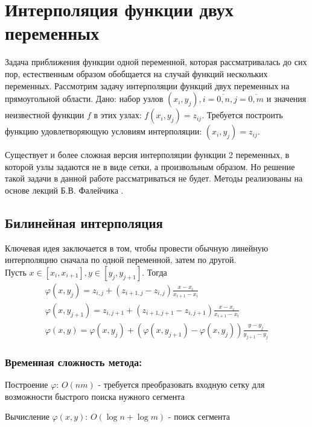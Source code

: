\section{Интерполяция функции двух переменных}

Задача приближения функции одной переменной, которая рассматривалась до сих пор, естественным образом обобщается на случай функций нескольких переменных. Рассмотрим задачу интерполяции функций двух переменных на прямоугольной области. Дано: набор узлов $(x_i,y_j), i=\overline{0,n}, j=\overline{0,m}$ и значения неизвестной функции $f$ в этих узлах: $f(x_i,y_j)=z_{ij}$. Требуется построить функцию удовлетворяющую условиям интерполяции: $(x_i,y_j) = z_{ij}$.

Существует и более сложная версия интерполяции функции 2 переменных, в которой узлы задаются не в виде сетки, а  произвольным образом. Но решение такой задачи в данной работе рассматриваться не будет. Методы реализованы на основе лекций Б.В. Фалейчика \cite{faleichik2010} \cite{faleichik2012}.

\subsection{Билинейная интерполяция}

Ключевая идея заключается в том, чтобы провести обычную линейную интерполяцию сначала по одной переменной, затем по другой. \\
\noindent Пусть $x \in [x_i,x_{i+1}], y \in [y_j,y_{j+1}]$. Тогда
\begin{equation}
  \begin{gathered}
    \varphi(x, y_j) = z_{i,j} + (z_{i+1,j} - z_{i,j}) \frac{x-x_i}{x_{i+1} - x_i} \\
    \varphi(x, y_{j+1}) = z_{i,j+1} + (z_{i+1,j+1} - z_{i,j+1}) \frac{x-x_i}{x_{i+1} - x_i} \\
    \varphi(x,y) = \varphi(x,y_j) + (\varphi(x, y_{j+1}) - \varphi(x, y_j)) \frac{y-y_j}{y_{j+1} - y_j}
  \end{gathered}
\end{equation}

\subsubsection{Временная сложность метода:}

Построение $\varphi$: $O(n m)$ - требуется преобразовать входную сетку для возможности быстрого поиска нужного сегмента

Вычисление $\varphi(x, y)$: $O(\log n + \log m)$ - поиск сегмента


